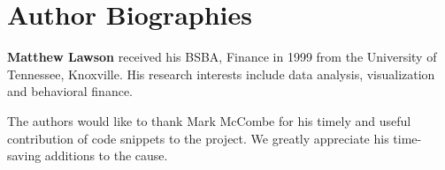 \documentclass[9pt,twocolumn,twoside]{../../styles/osajnl}
\begin{document}


 
\section*{Author Biographies}
\begingroup
\setlength\intextsep{0pt}
\begin{minipage}[t][3.2cm][t]{1.0\columnwidth} %
  \noindent
  {\bfseries Matthew Lawson} received his BSBA, Finance in 1999 from
  the University of Tennessee, Knoxville. His research interests include
  data analysis, visualization and behavioral finance.
\end{minipage}
\endgroup

\appendix
\begin{description}

\item The authors would like to thank Mark McCombe for his timely and useful contribution of code snippets  to the project.  We greatly appreciate his time-saving additions to the cause.

\end{description}
\end{document}
